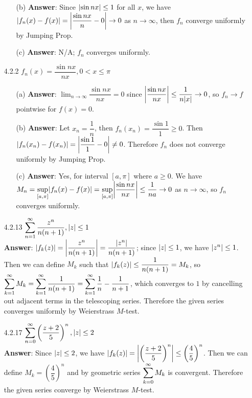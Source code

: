 \documentclass{article}
\begin{document}
\begin{itemize}
\begin{itemize}
                  \item [(b)] \textbf{Answer}: Since $\abs{\sin nx}\leq 1$ for all $x$, we have $\abs{f_n(x)-f(x)}=\abs{\dfrac{\sin nx}{n}-0}\rightarrow 0$ as $n\rightarrow\infty$, then $f_n$ converge uniformly by Jumping Prop.
                  \item [(c)] \textbf{Answer}: N/A; $f_n$ converges uniformly.
            \end{itemize}
      \item [4.2.2] $f_n(x)=\dfrac{\sin nx}{nx},0<x\leq\pi$
            \begin{itemize}
                  \item [(a)] \textbf{Answer}: $\lim_{n\rightarrow\infty}\dfrac{\sin nx}{nx}=0$ since $\abs{\dfrac{\sin nx}{nx}}\leq\dfrac{1}{n\abs{x}}\rightarrow 0$, so $f_n\rightarrow f$ pointwise for $f(x)=0$.
                  \item [(b)] \textbf{Answer}: Let $x_n=\dfrac{1}{n}$, then $f_n(x_n)=\dfrac{\sin 1}{1}\geq 0$. Then $\abs{f_n(x_n)-f(x_n)}=\abs{\dfrac{\sin 1}{1}-0}\neq 0$. Therefore $f_n$ does not converge uniformly by Jumping Prop.
                  \item [(c)] \textbf{Answer}: Yes, for interval $[a,\pi]$ where $a\geq 0$. We have $M_n=\mathlarger{\sup_{[a,\pi]}}\abs{f_n(x)-f(x)}=\mathlarger{\sup_{[a,\pi]}}\abs{\dfrac{\sin nx}{nx}}\leq\dfrac{1}{na}\rightarrow 0$ as $n\rightarrow\infty$, so $f_n$ converges uniformly.
            \end{itemize}
      \item [4.2.13] $\mathlarger{\sum_{n=1}^\infty\frac{z^n}{n(n+1)},\abs{z}\leq 1}$\\
            \textbf{Answer}: $\abs{f_k(z)}=\abs{\dfrac{z^n}{n(n+1)}}=\dfrac{\abs{z^n}}{n(n+1)}$; since $\abs{z}\leq 1$, we have $\abs{z^n}\leq 1$. Then we can define $M_k$ such that $\abs{f_k(z)}\leq\dfrac{1}{n(n+1)}=M_k$, so $\mathlarger{\sum_{k=1}^\infty M_k=\sum_{k=1}^\infty\dfrac{1}{n(n+1)}=\sum_{k=1}^\infty\dfrac{1}{n}-\dfrac{1}{n+1}}$, which converges to $1$ by cancelling out adjacent terms in the telescoping series. Therefore the given series converges uniformly by Weierstrass $M$-test.
      \item [4.2.17] $\mathlarger{\sum_{n=0}^\infty\left(\frac{z+2}{5}\right)^n,\abs{z}\leq 2}$\\
            \textbf{Answer}: Since $\abs{z}\leq 2$, we have $\abs{f_k(z)}=\abs{\left(\dfrac{z+2}{5}\right)^n}\leq\left(\dfrac{4}{5}\right)^n$. Then we can define $M_k=\left(\dfrac{4}{5}\right)^n$ and by geometric series $\mathlarger{\sum_{k=0}^\infty M_k}$ is convergent. Therefore the given series converge by Weierstrass $M$-test.

\end{itemize}
\end{document}
